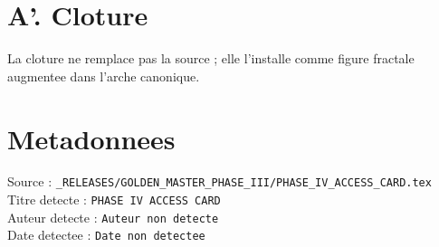 \documentclass[11pt,a4paper]{article}
\begin{document}
\section*{A'. Cloture}
La cloture ne remplace pas la source ; elle l'installe comme figure fractale augmentee dans l'arche canonique.

\section*{Metadonnees}
Source : \verb|_RELEASES/GOLDEN_MASTER_PHASE_III/PHASE_IV_ACCESS_CARD.tex|\\
Titre detecte : \texttt{PHASE IV ACCESS CARD}\\
Auteur detecte : \texttt{Auteur non detecte}\\
Date detectee : \texttt{Date non detectee}
\end{document}
